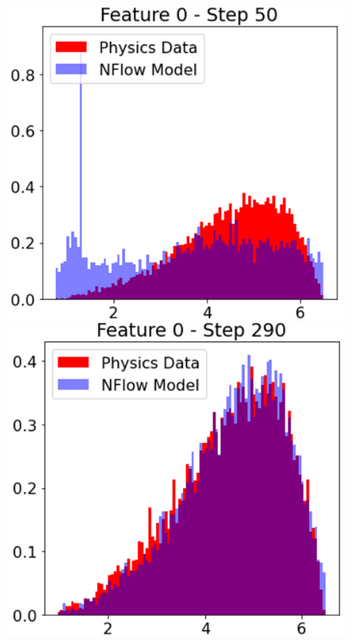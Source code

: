 \begin{figure}[!ht]
\begin{minipage}{0.25\textwidth}
        \centering
        \includegraphics[width=.9\textwidth,trim={0 0 0 0},clip]{pictures/milestoneR2/steps/s50.png}
        \includegraphics[width=.9\textwidth,trim={0 0 0 0},clip]{pictures/milestoneR2/steps/s290.png}
    \end{minipage}
    \begin{minipage}{0.4\textwidth}
    

\end{minipage}
\end{figure}
